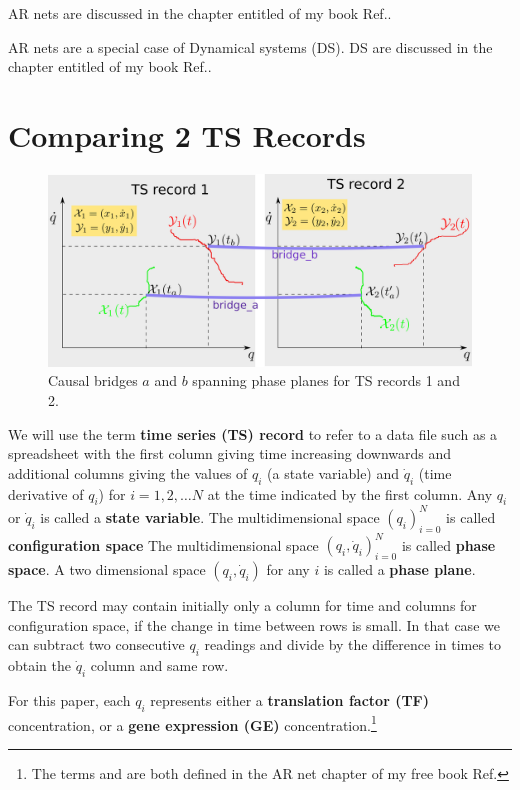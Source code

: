 \documentclass[12pt]{article}
\begin{document}
AR nets are 
discussed in the chapter entitled  of 
my book Ref.\cite{Bayesuvius}.

AR nets are a special case of Dynamical systems (DS). DS are discussed in the
chapter entitled 
of my book Ref.\cite{Bayesuvius}.


\section{Comparing 2 TS Records}
\begin{figure}[h!]
\centering
\includegraphics[width=5in]
{two-phase-plane-bridges.png}
\caption{Causal bridges $a$ and $b$ spanning
	phase planes for
TS records 1 and 2.}
\label{fig-two-phase-plane-bridges}
\end{figure}

We will use the term {\bf time series (TS) record}
to refer to
a data file such as a spreadsheet with the first column 
giving time increasing downwards and additional columns giving the values
of $q_i$ (a state variable) and $\dot{q}_i$ (time derivative of $q_i$) for $i=1, 2, \ldots N$
at the time indicated by the first column.
Any $q_i$ or $\dot{q}_i$ is called a {\bf state variable}.
The multidimensional space $(q_i)_{i=0}^{N}$
is called {\bf configuration space}
The multidimensional space $(q_i, \dot{q}_i)_{i=0}^{N}$
is called {\bf phase space}.
A two dimensional space $(q_i, \dot{q}_i)$ for any 
$i$ is called a {\bf phase plane}.

The TS record may contain initially only a column 
for time and columns for configuration space,
if the change in time between rows is small. 
In that case we can subtract two consecutive
$q_i$ readings and divide by the difference
in times to obtain the $\dot{q}_i$ column
and same row.

For this paper, each $q_i$ represents either a {\bf translation
factor (TF)} concentration, or a {\bf gene expression (GE)} concentration.\footnote{The 
terms 
and  are both defined
in the AR net chapter of my free book Ref.\cite{Bayesuvius}}
\end{document}
